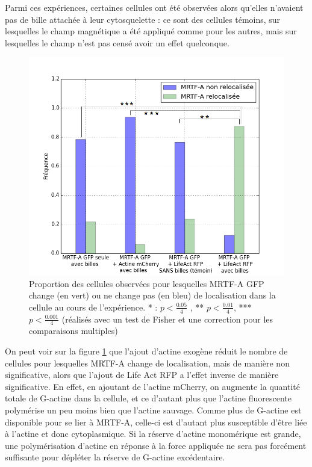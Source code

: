 \documentclass{report}
\begin{document}
Parmi ces expériences, certaines cellules ont été observées alors qu'elles n'avaient pas de bille attachée à leur cytosquelette : ce sont des cellules témoins, sur lesquelles le champ magnétique a été appliqué comme pour les autres, mais sur lesquelles le champ n'est pas censé avoir un effet quelconque. 

\begin{figure}
\includegraphics[scale=0.4]{Figures/Pinces_MRTFA_stars.png} 
\caption{Proportion des cellules observées pour lesquelles MRTF-A GFP change (en vert) ou ne change pas (en bleu) de localisation dans la cellule au cours de l'expérience. * : $p<\frac{0.05}{4}$ , ** $p<\frac{0.01}{4}$, *** $p<\frac{0.001}{4}$ (réalisés avec un test de Fisher et une correction pour les comparaisons multiples)\label{MRTF-A Pinces}}
\end{figure}

On peut voir sur la figure \ref{MRTF-A Pinces} que l'ajout d'actine exogène réduit le nombre de cellules pour lesquelles MRTF-A change de localisation, mais de manière non significative, alors que l'ajout de Life Act RFP a l'effet inverse de manière significative. 
En effet, en ajoutant de l'actine mCherry, on augmente la quantité totale de G-actine dans la cellule, et ce d'autant plus que l'actine fluorescente polymérise un peu moins bien que l'actine sauvage. Comme plus de G-actine est disponible pour se lier à MRTF-A, celle-ci est d'autant plus susceptible d'être liée à l'actine et donc cytoplasmique. 
Si la réserve d'actine monomérique est grande, une polymérisation d'actine en réponse à la force appliquée ne sera pas forcément suffisante pour dépléter la réserve de G-actine excédentaire.
\end{document}
